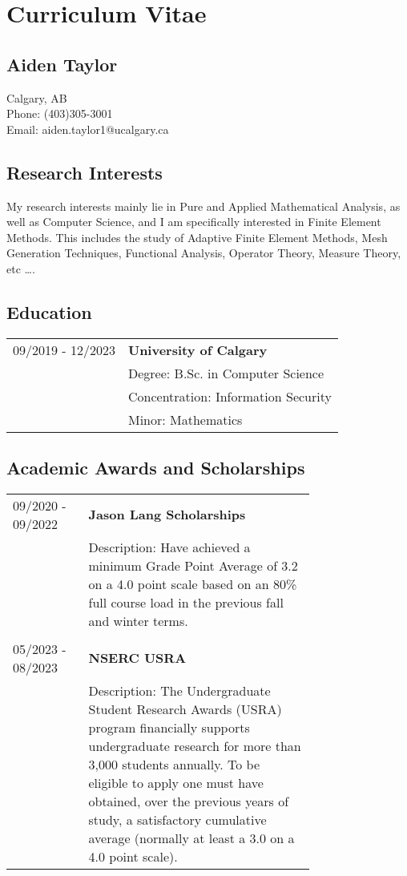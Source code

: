 \documentclass[12pt]{article}
\begin{document}
\section*{Curriculum Vitae}
\subsection*{Aiden Taylor}
Calgary, AB \\
Phone: (403)305-3001\\
Email: aiden.taylor1@ucalgary.ca
\subsection*{Research Interests}
My research interests mainly lie in Pure and Applied Mathematical Analysis, as well as Computer Science, and I am specifically interested in Finite Element Methods.
This includes the study of Adaptive Finite Element Methods, Mesh Generation Techniques, Functional Analysis,
Operator Theory, Measure Theory, etc \dots .
\subsection*{Education}
\begin{tabular}{l l}
09/2019 - 12/2023&\textbf{University of Calgary}\\
	                & Degree: B.Sc. in Computer Science\\
		        & Concentration: Information Security\\
		        & Minor: Mathematics
\end{tabular}
\subsection*{Academic Awards and Scholarships}
\begin{tabular}{l p{0.75\linewidth}}
09/2020 - 09/2022   &\textbf{Jason Lang Scholarships}\\
		    &Description: Have achieved a minimum Grade Point Average of 3.2 on a 4.0 point scale based on an 80\% full course load in the previous fall and winter terms.\\
		    &\\
05/2023 - 08/2023   &\textbf{NSERC USRA}\\
                    &Description: The Undergraduate Student Research Awards (USRA) program financially supports undergraduate research for more than 3,000 students annually.
		    To be eligible to apply one must have obtained, over the previous years of study, a satisfactory cumulative average (normally at least a 3.0 on a 4.0 point scale).
\end{tabular}
\end{document}
